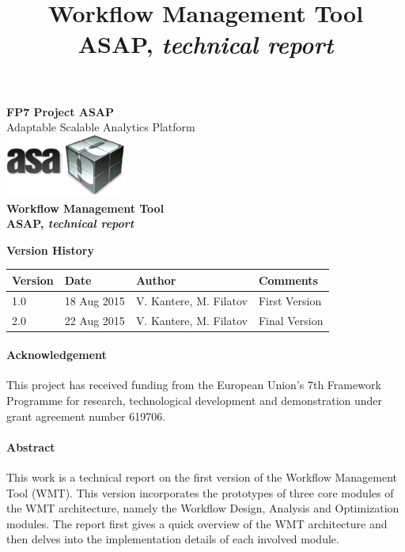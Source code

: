 \documentclass[12pt,openany,onecolumn]{book}
\def\delivtitle{Workflow Management Tool\\ {\small ASAP, {\rm \it technical report}}}
\begin{document}
\title{\delivtitle}
\author{}
\date{}
\newcommand{\eat}[1]{}

\thispagestyle{empty}
\begin{center}
\large
\textbf{FP7 Project ASAP} \\
Adaptable Scalable Analytics Platform\\[2\baselineskip]

\includegraphics[width=4cm]{asap-logo.png}\\[3\baselineskip]

{\Huge\bf \delivtitle}\\[3\baselineskip]
\end{center}

\textbf{Version History}
\begin{center}
\begin{tabular}{|l|p{3cm}|p{5cm}|p{3cm}|}
\rowcolor{gray}
\hline
Version & Date        & Author        & Comments \\
\hline
1.0 &  18 Aug 2015 & V. Kantere, M. Filatov & First Version \\
2.0	& 22  Aug 2015 & V. Kantere, M. Filatov & Final Version \\
\hline
\end{tabular}
\end{center}

\paragraph{Acknowledgement}
This project has received funding from the European Union's 7th Framework Programme for research, technological development and demonstration under grant agreement number 619706.

\paragraph{Abstract}
This work is a technical report on the first version of the Workflow Management Tool (WMT). This version incorporates the prototypes of three core modules of the WMT architecture, namely the Workflow Design, Analysis and Optimization modules. The report first gives a quick overview of the WMT architecture and then delves into the implementation details of each involved module.
\end{document}
